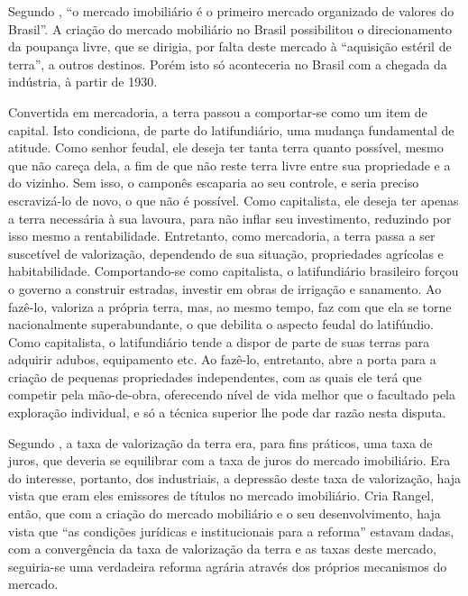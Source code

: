 \documentclass[
	12pt,				%
	oneside,			%
	a4paper,			%
	chapter=TITLE,		%
	section=TITLE,		%
	english,			%
	brazil				%
	]{abntex2}
\begin{document}
\begin{refsection}
Segundo \textcite[p.~207]{rangel1960}, ``o mercado imobiliário é o primeiro mercado
organizado de valores do Brasil''. A criação do mercado mobiliário no Brasil
possibilitou o direcionamento da poupança livre, que se dirigia, por falta deste
mercado à ``aquisição estéril de terra'', a outros destinos. Porém isto só
aconteceria no Brasil com a chegada da indústria, à partir de 1930.
\begin{citacao}
Convertida em mercadoria, a terra passou a comportar-se como um item de capital.
Isto condiciona, de parte do latifundiário, uma mudança fundamental de atitude.
Como senhor feudal, ele deseja ter tanta terra quanto possível, mesmo que não
careça dela, a fim de que não reste terra livre entre sua propriedade e a do 
vizinho. Sem isso, o camponês escaparia ao seu controle, e seria preciso 
escravizá-lo de novo, o que não é possível. Como capitalista, ele deseja ter 
apenas a terra necessária à sua lavoura, para não inflar seu investimento, 
reduzindo por isso mesmo a rentabilidade.  
Entretanto, como mercadoria, a terra passa a ser suscetível de valorização, 
dependendo de sua situação, propriedades agrícolas e habitabilidade. 
Comportando-se como capitalista, o latifundiário brasileiro forçou o governo a
construir estradas, investir em obras de irrigação e sanamento. Ao fazê-lo, 
valoriza a própria terra, mas, ao mesmo tempo, faz com que ela se torne 
nacionalmente superabundante, o que debilita o aspecto feudal do latifúndio.
Como capitalista, o latifundiário tende a dispor de parte de suas terras para 
adquirir adubos, equipamento etc. Ao fazê-lo, entretanto, abre a porta para a 
criação de pequenas propriedades independentes, com as quais ele terá que 
competir pela mão-de-obra, oferecendo nível de vida melhor que o facultado pela
exploração individual, e só a técnica superior lhe pode dar razão nesta disputa.
\end{citacao}
Segundo \textcite{rangel1960}, a taxa de valorização da terra era, para fins práticos, uma
taxa de juros, que deveria se equilibrar com a taxa de juros do mercado
imobiliário. Era do interesse, portanto, dos industriais, a depressão deste taxa
de valorização, haja vista que eram eles emissores de títulos no mercado
imobiliário. Cria Rangel, então, que com a criação do mercado mobiliário e o seu
desenvolvimento, haja vista que ``as condições jurídicas e institucionais para a
reforma'' estavam dadas, com a convergência da taxa de valorização da terra e as
taxas deste mercado, seguiria-se uma verdadeira reforma agrária através dos
próprios mecanismos do mercado.


\end{refsection}
\end{document}
